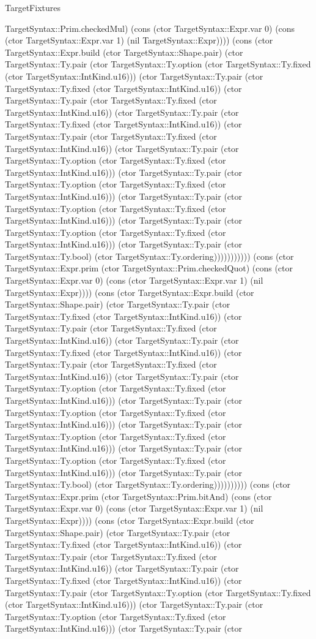 \begin{lexlean}{TargetFixtures}
\begin{semanticmodule}
{TargetSyntax::Prim.checkedMul) (cons (ctor TargetSyntax::Expr.var 0) (cons (ctor TargetSyntax::Expr.var 1) (nil TargetSyntax::Expr)))) (cons (ctor TargetSyntax::Expr.build (ctor TargetSyntax::Shape.pair) (ctor TargetSyntax::Ty.pair (ctor TargetSyntax::Ty.option (ctor TargetSyntax::Ty.fixed (ctor TargetSyntax::IntKind.u16))) (ctor TargetSyntax::Ty.pair (ctor TargetSyntax::Ty.fixed (ctor TargetSyntax::IntKind.u16)) (ctor TargetSyntax::Ty.pair (ctor TargetSyntax::Ty.fixed (ctor TargetSyntax::IntKind.u16)) (ctor TargetSyntax::Ty.pair (ctor TargetSyntax::Ty.fixed (ctor TargetSyntax::IntKind.u16)) (ctor TargetSyntax::Ty.pair (ctor TargetSyntax::Ty.fixed (ctor TargetSyntax::IntKind.u16)) (ctor TargetSyntax::Ty.pair (ctor TargetSyntax::Ty.option (ctor TargetSyntax::Ty.fixed (ctor TargetSyntax::IntKind.u16))) (ctor TargetSyntax::Ty.pair (ctor TargetSyntax::Ty.option (ctor TargetSyntax::Ty.fixed (ctor TargetSyntax::IntKind.u16))) (ctor TargetSyntax::Ty.pair (ctor TargetSyntax::Ty.option (ctor TargetSyntax::Ty.fixed (ctor TargetSyntax::IntKind.u16))) (ctor TargetSyntax::Ty.pair (ctor TargetSyntax::Ty.option (ctor TargetSyntax::Ty.fixed (ctor TargetSyntax::IntKind.u16))) (ctor TargetSyntax::Ty.pair (ctor TargetSyntax::Ty.bool) (ctor TargetSyntax::Ty.ordering))))))))))) (cons (ctor TargetSyntax::Expr.prim (ctor TargetSyntax::Prim.checkedQuot) (cons (ctor TargetSyntax::Expr.var 0) (cons (ctor TargetSyntax::Expr.var 1) (nil TargetSyntax::Expr)))) (cons (ctor TargetSyntax::Expr.build (ctor TargetSyntax::Shape.pair) (ctor TargetSyntax::Ty.pair (ctor TargetSyntax::Ty.fixed (ctor TargetSyntax::IntKind.u16)) (ctor TargetSyntax::Ty.pair (ctor TargetSyntax::Ty.fixed (ctor TargetSyntax::IntKind.u16)) (ctor TargetSyntax::Ty.pair (ctor TargetSyntax::Ty.fixed (ctor TargetSyntax::IntKind.u16)) (ctor TargetSyntax::Ty.pair (ctor TargetSyntax::Ty.fixed (ctor TargetSyntax::IntKind.u16)) (ctor TargetSyntax::Ty.pair (ctor TargetSyntax::Ty.option (ctor TargetSyntax::Ty.fixed (ctor TargetSyntax::IntKind.u16))) (ctor TargetSyntax::Ty.pair (ctor TargetSyntax::Ty.option (ctor TargetSyntax::Ty.fixed (ctor TargetSyntax::IntKind.u16))) (ctor TargetSyntax::Ty.pair (ctor TargetSyntax::Ty.option (ctor TargetSyntax::Ty.fixed (ctor TargetSyntax::IntKind.u16))) (ctor TargetSyntax::Ty.pair (ctor TargetSyntax::Ty.option (ctor TargetSyntax::Ty.fixed (ctor TargetSyntax::IntKind.u16))) (ctor TargetSyntax::Ty.pair (ctor TargetSyntax::Ty.bool) (ctor TargetSyntax::Ty.ordering)))))))))) (cons (ctor TargetSyntax::Expr.prim (ctor TargetSyntax::Prim.bitAnd) (cons (ctor TargetSyntax::Expr.var 0) (cons (ctor TargetSyntax::Expr.var 1) (nil TargetSyntax::Expr)))) (cons (ctor TargetSyntax::Expr.build (ctor TargetSyntax::Shape.pair) (ctor TargetSyntax::Ty.pair (ctor TargetSyntax::Ty.fixed (ctor TargetSyntax::IntKind.u16)) (ctor TargetSyntax::Ty.pair (ctor TargetSyntax::Ty.fixed (ctor TargetSyntax::IntKind.u16)) (ctor TargetSyntax::Ty.pair (ctor TargetSyntax::Ty.fixed (ctor TargetSyntax::IntKind.u16)) (ctor TargetSyntax::Ty.pair (ctor TargetSyntax::Ty.option (ctor TargetSyntax::Ty.fixed (ctor TargetSyntax::IntKind.u16))) (ctor TargetSyntax::Ty.pair (ctor TargetSyntax::Ty.option (ctor TargetSyntax::Ty.fixed (ctor TargetSyntax::IntKind.u16))) (ctor TargetSyntax::Ty.pair (ctor }
\end{semanticmodule}
\end{lexlean}
